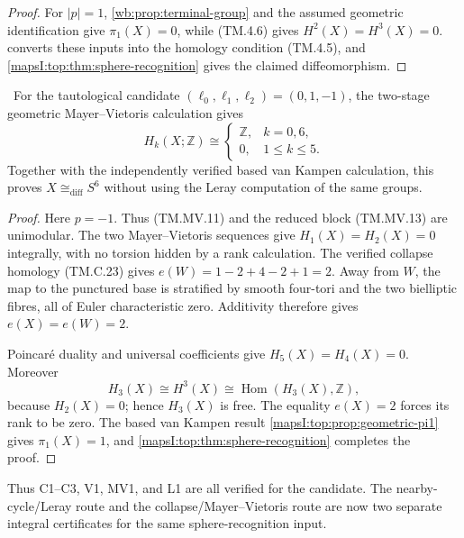 \begin{proof}
For $|p|=1$, 
\cref{wb:prop:terminal-group} and the assumed geometric identification give
$\pi_1(X)=0$, while (TM.4.6) gives $H^2(X)=H^3(X)=0$.
 converts these inputs into the homology
condition (TM.4.5), and
\cref{mapsI:top:thm:sphere-recognition} gives the claimed diffeomorphism.
\end{proof}

\begin{corollary}
\label{mapsI:top:cor:candidate-mv-sphere}
\ For the tautological candidate
$(\ell_0,\ell_1,\ell_2)=(0,1,-1)$, the two-stage geometric
Mayer--Vietoris calculation gives
\[
 H_k(X;\mathbb Z)\cong
 \begin{cases}
 \mathbb Z,&k=0,6,\\
 0,&1\leq k\leq5.
 \end{cases}
\]
Together with the independently verified based van Kampen calculation, this
proves $X\cong_{\mathrm{diff}}S^6$ without using the Leray computation of the
same groups.
\end{corollary}

\begin{proof}
Here $p=-1$.  Thus (TM.MV.11) and the reduced block (TM.MV.13) are unimodular.
The two Mayer--Vietoris sequences give $H_1(X)=H_2(X)=0$ integrally, with no
torsion hidden by a rank calculation.  The verified collapse homology
(TM.C.23) gives $e(W)=1-2+4-2+1=2$.  Away from $W$, the map to the punctured
base is stratified by smooth four-tori and the two bielliptic fibres, all of
Euler characteristic zero.  Additivity therefore gives $e(X)=e(W)=2$.

Poincar\'e duality and universal coefficients give $H_5(X)=H_4(X)=0$.
Moreover
\[
 H_3(X)\cong H^3(X)\cong\operatorname{Hom}(H_3(X),\mathbb Z),
\]
because $H_2(X)=0$; hence $H_3(X)$ is free.  The equality $e(X)=2$ forces
its rank to be zero.  The based van Kampen result
\cref{mapsI:top:prop:geometric-pi1} gives $\pi_1(X)=1$, and
\cref{mapsI:top:thm:sphere-recognition} completes the proof.
\end{proof}

Thus C1--C3, V1, MV1, and L1 are all verified for the candidate.  The
nearby-cycle/Leray route and the collapse/Mayer--Vietoris route are now two
separate integral certificates for the same sphere-recognition input.
